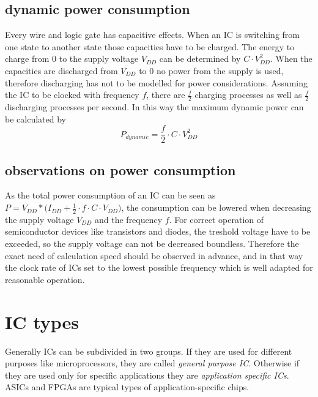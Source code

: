 \subsection{dynamic power consumption}
Every wire and logic gate has capacitive effects. When an IC is switching from one state to another state those capacities have to be charged. The energy to charge from 0 to the supply voltage $V_{DD}$ can be determined by $C\cdot V_{DD}^2$. When the capacities are discharged from $V_{DD}$ to 0 no power from the supply is used\cite{Har13}, therefore discharging has not to be modelled for power considerations. Assuming the IC to be clocked with frequency $f$, there are $\frac{f}{2}$ charging processes as well as $\frac{f}{2}$ discharging processes per second. In this way the maximum dynamic power can be calculated by
\begin{equation}
P_{dynamic}=\frac{f}{2}\cdot C\cdot V_{DD}^2
\end{equation}
\subsection{observations on power consumption}
As the total power consumption of an IC can be seen as $P=V_{DD}*\big(I_{DD}+\frac{1}{2}\cdot f\cdot C\cdot V_{DD}\big)$, the consumption can be lowered when decreasing the supply voltage $V_{DD}$ and the frequency $f$. For correct operation of semiconductor devices like transistors and diodes, the treshold voltage have to be exceeded, so the supply voltage can not be decreased boundless. Therefore the exact need of calculation speed should be observed in advance, and in that way the clock rate of ICs set to the lowest possible frequency which is well adapted for reasonable operation. 
\section{IC types}
Generally ICs can be subdivided in two groups. If they are used for different purposes like microprocessors, they are called \textit{general purpose IC}. Otherwise if they are used only for specific applications they are \textit{application specific ICs}. ASICs and FPGAs are typical types of application-specific chips.
